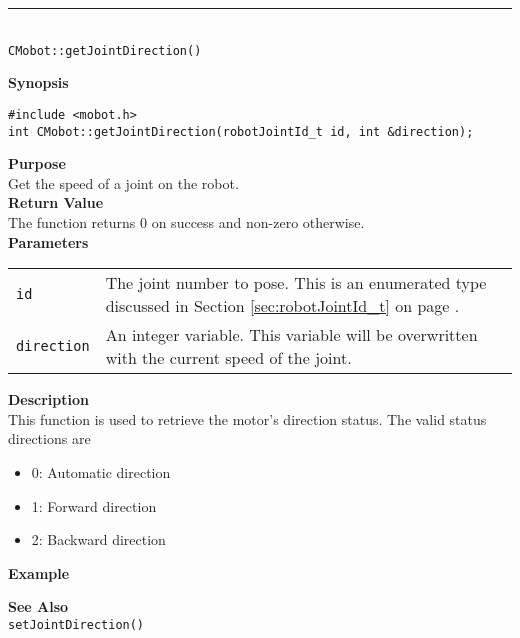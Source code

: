 \noindent
\vspace{5pt}
\rule{4.5in}{0.015in}\\
\noindent
{\LARGE \texttt{CMobot::getJointDirection()}}\\
{}

\noindent
{\bf Synopsis}\\
\begin{verbatim}
#include <mobot.h>
int CMobot::getJointDirection(robotJointId_t id, int &direction);
\end{verbatim}

\noindent
{\bf Purpose}\\
Get the speed of a joint on the robot.\\

\noindent
{\bf Return Value}\\
The function returns 0 on success and non-zero otherwise.\\

\noindent
{\bf Parameters}
\vspace{-0.1in}
\begin{description}
\item               
\begin{tabular}{p{10 mm}p{145 mm}}
\texttt{id} & The joint number to pose. This is an enumerated type 
discussed in Section \ref{sec:robotJointId_t} on page
\pageref{sec:robotJointId_t}.\\
\texttt{direction} & An integer variable. This variable will be overwritten
with the current speed of the joint.
\end{tabular}
\end{description}

\noindent
{\bf Description}\\
This function is used to retrieve the motor's direction status. The valid
status directions are
\begin{itemize}
\item 0: Automatic direction
\item 1: Forward direction
\item 2: Backward direction
\end{itemize}

\noindent
{\bf Example}\\
\noindent

\noindent
{\bf See Also}\\
\texttt{setJointDirection()}

